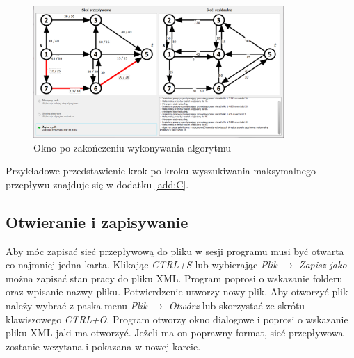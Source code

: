 \begin{figure}[H]
	\centering
	\includegraphics[width=0.85\textwidth]{./img/spec_zew06_5}
	\caption{Okno po zakończeniu wykonywania algorytmu}
	\label{fig:algorithmWindowFinished}
\end{figure}
Przykładowe przedstawienie krok po kroku wyszukiwania maksymalnego przepływu znajduje się w dodatku \ref{add:C}.
\subsection{Otwieranie i zapisywanie}
Aby móc zapisać sieć przepływową do pliku w sesji programu musi być otwarta co najmniej jedna karta. Klikając \textit{CTRL+S} lub wybierając \textit{Plik} $ \rightarrow $ \textit{Zapisz jako} można zapisać stan pracy do pliku XML. Program poprosi o wskazanie folderu oraz wpisanie nazwy pliku. Potwierdzenie utworzy nowy plik.
Aby otworzyć plik należy wybrać z paska menu \textit{Plik} $\rightarrow$ \textit{Otwórz} lub skorzystać ze skrótu klawiszowego \textit{CTRL+O}. Program otworzy okno dialogowe i poprosi o wskazanie pliku XML jaki ma otworzyć. Jeżeli ma on poprawny format, sieć przepływowa zostanie wczytana i pokazana w nowej karcie.